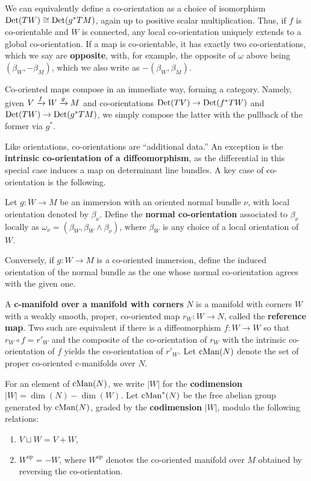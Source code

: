 We can equivalently define a co-orientation as a choice of isomorphism ${\rm Det}(TW)\cong {\rm Det}(g^*TM)$, again up to positive scalar multiplication.
Thus, if $f$ is co-orientable and $W$ is connected, any local co-orientation uniquely extends to a global co-orientation.
If a map is co-orientable, it has exactly two co-orientations, which we say are \textbf{opposite}, with, for example, the opposite of $\omega$ above being $(\beta_W, -\beta_M)$, which we also write as $-(\beta_W, \beta_M)$.

Co-oriented maps compose in an immediate way, forming a category.
Namely, given $V \xrightarrow{f} W \xrightarrow{g} M$ and co-orientations ${\rm Det}(TV) \to {\rm Det}(f^*TW)$ and ${\rm Det}(TW)\to {\rm Det}(g^*TM)$, we simply compose the latter with the pullback of the former via $g^*$.

Like orientations, co-orientations are ``additional data.''
An exception is the {\bf intrinsic co-orientation of a diffeomorphism}, as the differential
in this special case induces a map on determinant line bundles.
A key case of co-orientation is the following.

\begin{definition}\label{D:normal co-or}
	Let $g \colon W \to M$ be an immersion with an oriented normal bundle $\nu$, with local orientation denoted by $\beta_\nu$.
	Define the \textbf{normal co-orientation} associated to $\beta_\nu$ locally as $\omega_{\nu} = (\beta_W, \beta_W \wedge \beta_\nu)$, where	$\beta_W$ is any choice of a local orientation of $W$.

	Conversely, if $g \colon W \to M$ is a co-oriented immersion, define the induced orientation of the normal bundle as the one whose normal co-orientation	agrees with the given one.
\end{definition}

\begin{definition}\label{V: maps are co-oriented}
	A \textbf{c-manifold over a manifold with corners} $N$ is a
	manifold with corners $W$ with a weakly smooth, proper, co-oriented map $r_W \colon W \to N$, called the \textbf{reference map}.
	Two such are equivalent if there is a diffeomorphism $f \colon W \to W$ so that $r_W \circ f = r'_W$ and the composite of the co-orientation of $r_W$ with the intrinsic co-orientation of $f$ yields the co-orientation of $r'_W$.
	Let $\mathrm{cMan}(N)$ denote the set of proper co-oriented c-manifolds over $N$.

	For an element of $\mathrm{cMan}(N)$, we write $|W|$ for the \textbf{codimension} $|W|=\dim(N)-\dim(W)$.
	Let $\mathrm{cMan}^*(N)$ be the free abelian group generated by $\mathrm{cMan}(N)$, graded by the \textbf{codimension} $|W|$, modulo the following relations:
	\begin{enumerate}
		\item ${V \sqcup W} = V + W$,
		\item ${{W}^{op}} = -W$, where ${W}^{op}$ denotes the co-oriented manifold over $M$ obtained by reversing the co-orientation.
	\end{enumerate}
\end{definition}

